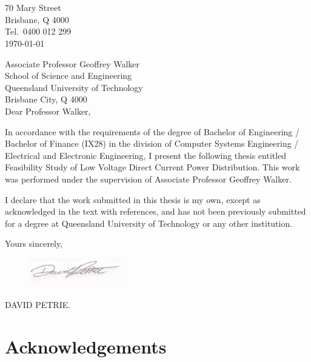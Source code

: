 \newpage


\section*{}

\begin{flushright}
	70 Mary Street\\
	Brisbane, Q 4000\\
	Tel.\ 0400 012 299\\
	\medskip
	\today
\end{flushright}
\begin{flushleft}
  Associate Professor Geoffrey Walker\\
  School of Science and Engineering\\
  Queensland University of Technology\\
  Brisbane City, Q 4000\\
  \bigskip\bigskip
  Dear Professor Walker,
\end{flushleft}

In accordance with the requirements of the degree of Bachelor of
Engineering / Bachelor of Finance (IX28) in the division of Computer Systems
Engineering / Electrical and Electronic Engineering, I present the
following thesis entitled Feasibility Study of Low Voltage Direct Current Power Distribution.  This work was performed under the supervision of Associate Professor Geoffrey Walker.

I declare that the work submitted in this thesis is my own, except as
acknowledged in the text with references, and has not been previously
submitted for a degree at Queensland University of Technology or any other
institution.

\begin{flushright}
	Yours sincerely,\\
	\medskip
	\begin{figure}[H]
	\hfill\includegraphics[width = 40mm]{images/Signature.JPG}%
	\end{figure} 
	\medskip
	DAVID PETRIE.
\end{flushright}

\newpage

\section*{Acknowledgements}

